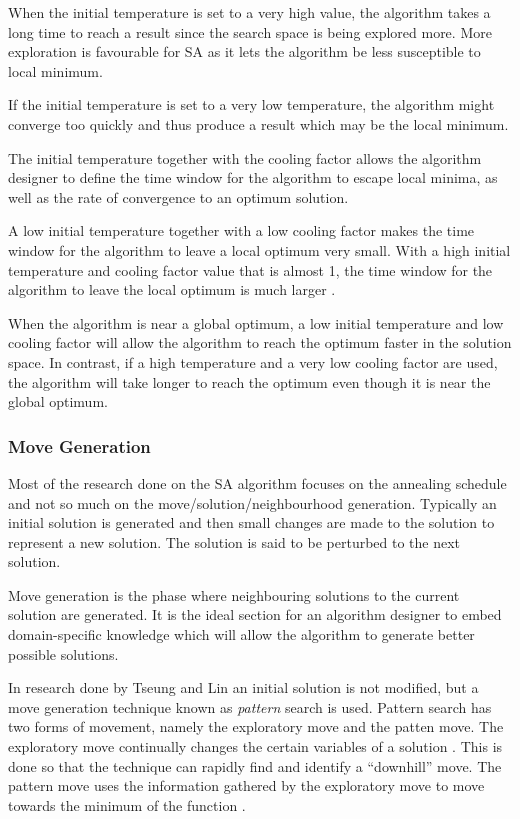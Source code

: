 When the initial temperature is set to a very high value, the algorithm takes a long time to reach a result since the search space is being explored more\cite{SALongestCommon,VariousCoolingSA}. More exploration is favourable for \gls{SA} as it lets the algorithm be less susceptible to local minimum. 

If the initial temperature is set to a very low temperature, the algorithm might converge too quickly and thus produce a result which may be the local minimum\cite{SALongestCommon,VariousCoolingSA,AutoConfigSA}.

The initial temperature together with the cooling factor allows the algorithm designer to define the time window for the algorithm to escape local minima, as well as the rate of convergence to an optimum solution\cite{SALongestCommon,VariousCoolingSA}.

A low initial temperature together with a low cooling factor makes the time window for the algorithm to leave a local optimum very small\cite{SALongestCommon}. With a high initial temperature and cooling factor value that is almost 1, the time window for the algorithm to leave the local optimum is much larger \cite{SALongestCommon}. 

When the algorithm is near a global optimum, a low initial temperature and low cooling factor will allow the algorithm to reach the optimum faster in the solution space\cite{SALongestCommon}. In contrast, if a high temperature and a very low cooling factor are used, the algorithm will take longer to reach the optimum even though it is near the global optimum\cite{SALongestCommon}.

\subsubsection{Move Generation}
Most of the research done on the \gls{SA} algorithm focuses on the annealing schedule and not so much on the move/solution/neighbourhood generation. Typically an initial solution is generated and then small changes are made to the solution to represent a new solution. The solution is said to be perturbed to the next solution.

Move generation is the phase where neighbouring solutions to the current solution are generated. It is the ideal section for an algorithm designer to embed domain-specific knowledge which will allow the algorithm to generate better possible solutions.

In research done by Tseung and Lin \cite{CurveFittingSA} an initial solution is not modified, but a move generation technique known as \emph{pattern} search is used. Pattern search has two forms of movement, namely the exploratory move and the patten move. The exploratory move continually changes the certain variables of a solution \cite{CurveFittingSA}. This is done so that the technique can rapidly find and identify a ``downhill'' move. The pattern move uses the information gathered by the exploratory move to move towards the minimum of the function \cite{CurveFittingSA}.
